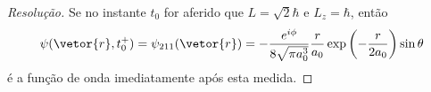 \begin{proof}[Resolução]
    Se no instante \(t_0\) for aferido que \(L = \sqrt{2}\hbar\) e \(L_z = \hbar\), então
    \begin{equation*}
        \psi(\vetor{r}, t_0^+) = \psi_{211}(\vetor{r}) = -\frac{e^{i\phi}}{8\sqrt{\pi a_0^3}} \frac{r}{a_0} \exp\left(-\frac{r}{2a_0}\right) \sin\theta
    \end{equation*}
    é a função de onda imediatamente após esta medida.
\end{proof}
